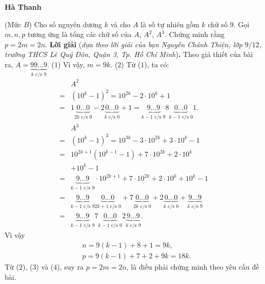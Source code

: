 \begin{multicols}{2}
	\begin{flushright}
		\textbf{\color{thachthuctoanhoc}Hà Thanh}
	\end{flushright}
	{}
	(Mức $B$) Cho số nguyên dương $k$ và cho $A$ là số tự nhiên gồm $k$ chữ số $9$. Gọi $m, n, p$ tương ứng là tổng các chữ số của $A$, $A^2$, $A^3$. Chứng minh rằng $p = 2m = 2n$.
	\vskip 0.05cm
	\textbf{\color{thachthuctoanhoc}Lời giải} (\textit{dựa theo lời giải của bạn Nguyễn Chánh Thiện, lớp $9/12$, trường THCS Lê Quý Đôn, Quận 3, Tp. Hồ Chí Minh})\textbf{\color{thachthuctoanhoc}.}
	\vskip 0.05cm
	Theo giả thiết của bài ra, $A = \underbrace {99 \ldots 9}_{k{\text{ c/s }}9}.$ \hfill ($1$)
	\vskip 0.05cm
	Vì vậy, $m = 9k$. \hfill ($2$)
	\vskip 0.05cm
	Từ ($1$), ta có:
	\begin{align*}
			&{A^2} \\
			=& {\left( {{{10}^k} - 1} \right)^2} = {10^{2k}} - 2 \cdot {10^k} + 1 \\
			= &1\underbrace {0 \ldots 0}_{2k{\text{ c/s }}0} - 2\underbrace {0 \ldots 0}_{k {\text{ c/s }} 0} + 1 = \underbrace {9 \ldots 9}_{k - 1{\text{ c/s }}9}8\underbrace {0 \ldots 0}_{k - 1{\text{ c/s }}0}1.\\
				&{A^3} \\
				=& {\left( {{{10}^k} - 1} \right)^3} = {10^{3k}} - 3 \cdot {10^{2k}} + 3 \cdot {10^k} - 1\\
				 =& {10^{2k + 1}}\left( {{{10}^{k - 1}} - 1} \right) + 7 \cdot {10^{2k}} + 2 \cdot {10^k} \\
				 &+ {10^k} - 1\\
				 =& \underbrace {9 \ldots 9}_{k - 1{\text{ c/s }}9} \cdot {10^{2k + 1}} + 7 \cdot {10^{2k}} + 2 \cdot {10^k} + {10^k} - 1\\
				 =& \underbrace {9 \ldots 9}_{k - 1{\text{ c/s }}9}\underbrace {0 \ldots 0}_{2k + 1{\text{ c/s }}0} + 7\underbrace {0 \ldots 0}_{2k{\text{ c/s }}0} + 2\underbrace {0 \ldots 0}_{k{\text{ c/s }}0} + \underbrace {9 \ldots 9}_{k{\text{ c/s }}9}\\
				 =&\underbrace {9 \ldots 9}_{k - 1{\text{ c/s }}9}7\underbrace {0 \ldots 0}_{k - 1{\text{ c/s }}0}2\underbrace {9 \ldots 9}_{k{\text{ c/s }}9}.
	\end{align*}
	Vì vậy
	\begin{align*}
		&n = 9(k - 1) + 8 + 1 = 9k, \tag{$3$}\\
		&p = 9(k - 1) + 7 + 2 + 9k = 18k. \tag{$4$}
	\end{align*}
	Từ ($2$), ($3$) và ($4$), suy ra $p = 2m = 2n$, là điều phải chứng minh theo yêu cầu đề bài.

\end{multicols}

